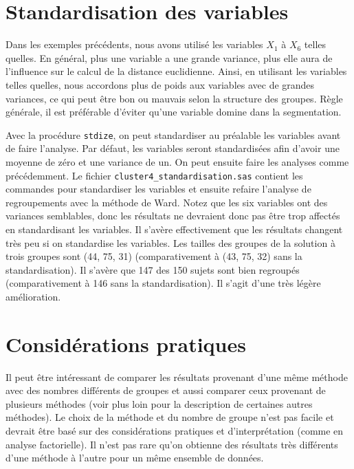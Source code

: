 \documentclass[
  11pt,
  letterpaper,
]{book}
\theoremstyle{definition}
\theoremstyle{definition}
\theoremstyle{definition}
\theoremstyle{remark}
\begin{document}
\hypertarget{standardisation-des-variables}{%
\section{Standardisation des variables}\label{standardisation-des-variables}}

Dans les exemples précédents, nous avons utilisé les variables \(X_1\) à \(X_6\) telles quelles. En général, plus une variable a une grande variance, plus elle aura de l'influence sur le calcul de la distance euclidienne. Ainsi, en utilisant les variables telles quelles, nous accordons plus de poids aux variables avec de grandes variances, ce qui peut être bon ou mauvais selon la structure des groupes. Règle générale, il est préférable d'éviter qu'une variable domine dans la segmentation.

Avec la procédure \texttt{stdize}, on peut standardiser au préalable les variables avant de faire l'analyse. Par défaut, les variables seront standardisées afin d'avoir une moyenne de zéro et une variance de un. On peut ensuite faire les analyses comme précédemment. Le fichier \texttt{cluster4\_standardisation.sas} contient les commandes pour standardiser les variables et ensuite refaire l'analyse de regroupements avec la méthode de Ward. Notez que les six variables ont des variances semblables, donc les résultats ne devraient donc pas être trop affectés en standardisant les variables. Il s'avère effectivement que les résultats changent très peu si on standardise les variables. Les tailles des groupes de la solution à trois groupes sont (44, 75, 31) (comparativement à (43, 75, 32) sans la standardisation). Il s'avère que 147 des 150 sujets sont bien regroupés (comparativement à 146 sans la standardisation). Il s'agit d'une très légère amélioration.

\hypertarget{considuxe9rations-pratiques}{%
\section{Considérations pratiques}\label{considuxe9rations-pratiques}}

Il peut être intéressant de comparer les résultats provenant d'une même méthode avec des nombres différents de groupes et aussi comparer ceux provenant de plusieurs méthodes (voir plus loin pour la description de certaines autres méthodes). Le choix de la méthode et du nombre de groupe n'est pas facile et devrait être basé sur des considérations pratiques et d'interprétation (comme en analyse factorielle). Il n'est pas rare qu'on obtienne des résultats très différents d'une méthode à l'autre pour un même ensemble de données.
\end{document}
